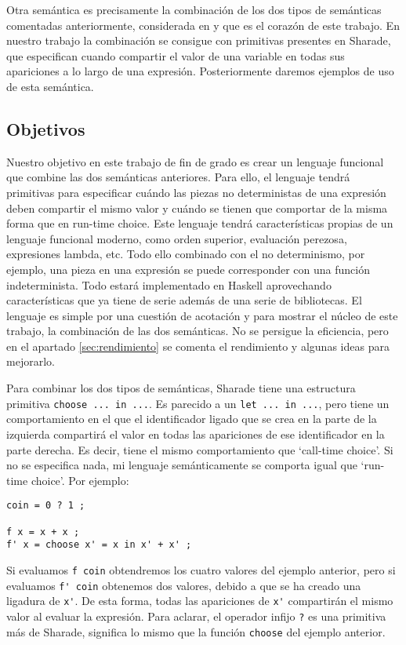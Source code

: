 \documentclass[class=article, crop=false]{standalone}
\begin{document}
Otra semántica es precisamente la combinación de los dos tipos de semánticas comentadas
anteriormente, considerada en \cite{riesco2014singular} y que es el corazón de este trabajo.
En nuestro trabajo la combinación se consigue con primitivas presentes en Sharade, que
especifican cuando compartir el valor de una variable en todas sus apariciones a lo largo de
una expresión. Posteriormente daremos ejemplos de uso de esta semántica.

\subsection{Objetivos}
Nuestro objetivo en este trabajo de fin de grado es crear un lenguaje funcional que combine
las dos semánticas anteriores. Para ello, el lenguaje tendrá primitivas para especificar
cuándo las piezas no deterministas de una expresión deben compartir el mismo valor y cuándo
se tienen que comportar de la misma forma que en run-time choice. Este lenguaje tendrá
características propias de un lenguaje funcional moderno, como orden superior, evaluación
perezosa, expresiones lambda, etc. Todo ello combinado con el no determinismo, por ejemplo,
una pieza en una expresión se puede corresponder con una función indeterminista. Todo estará
implementado en Haskell aprovechando características que ya tiene de serie además de una
serie de bibliotecas. El lenguaje es simple por una cuestión de acotación y para mostrar el
núcleo de este trabajo, la combinación de las dos semánticas. No se persigue la eficiencia,
pero en el apartado \ref{sec:rendimiento} se comenta el rendimiento y algunas ideas para
mejorarlo.

Para combinar los dos tipos de semánticas, Sharade tiene una estructura primitiva
\verb`choose ... in ...`. Es parecido a un \verb`let ... in ...`, pero tiene un
comportamiento en el que el identificador ligado que se crea en la parte de la izquierda
compartirá el valor en todas las apariciones de ese identificador en la parte derecha. Es
decir, tiene el mismo comportamiento que `call-time choice'. Si no se especifica nada, mi
lenguaje semánticamente se comporta igual que `run-time choice'. Por ejemplo:

\begin{verbatim}
coin = 0 ? 1 ;

f x = x + x ;
f' x = choose x' = x in x' + x' ;
\end{verbatim}

Si evaluamos \verb`f coin` obtendremos los cuatro valores del ejemplo anterior, pero si
evaluamos \verb`f' coin` obtenemos dos valores, debido a que se ha creado una ligadura de
\verb`x'`. De esta forma, todas las apariciones de \verb`x'` compartirán el mismo valor al
evaluar la expresión. Para aclarar, el operador infijo \verb`?` es una primitiva más de
Sharade, significa lo mismo que la función \verb`choose` del ejemplo anterior.
\end{document}
